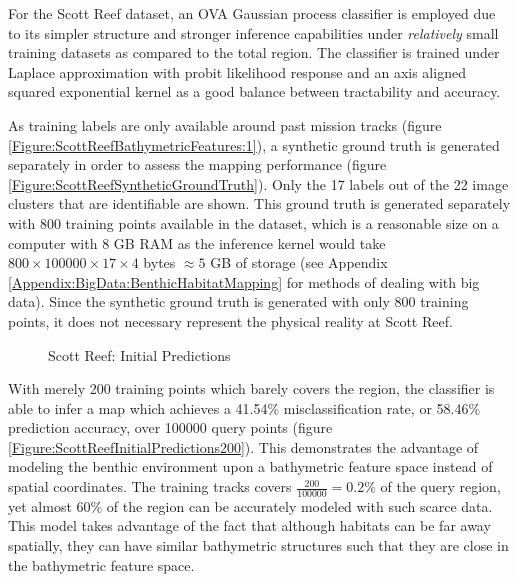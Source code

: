 		For the Scott Reef dataset, an OVA Gaussian process classifier is employed due to its simpler structure and stronger inference capabilities under \textit{relatively} small training datasets as compared to the total region. The classifier is trained under Laplace approximation with probit likelihood response and an axis aligned squared exponential kernel as a good balance between tractability and accuracy.

		As training labels are only available around past mission tracks (figure \ref{Figure:ScottReefBathymetricFeatures:1}), a synthetic ground truth is generated separately in order to assess the mapping performance (figure \ref{Figure:ScottReefSyntheticGroundTruth}). Only the 17 labels out of the 22 image clusters that are identifiable are shown. This ground truth is generated separately with 800 training points available in the dataset, which is a reasonable size on a computer with 8 GB RAM as the inference kernel would take $800 \times 100000 \times 17 \times 4$ bytes $\approx 5$ GB of storage (see Appendix \ref{Appendix:BigData:BenthicHabitatMapping} for methods of dealing with big data). Since the synthetic ground truth is generated with only 800 training points, it does not necessary represent the physical reality at Scott Reef. 

		\begin{figure}[!htbp]
		\centering
		\caption{Scott Reef: Initial Predictions}
		\label{Figure:ScottReefInitialPredictions}
		\end{figure}
		
		With merely 200 training points which barely covers the region, the classifier is able to infer a map which achieves a 41.54\% misclassification rate, or 58.46\% prediction accuracy, over 100000 query points (figure \ref{Figure:ScottReefInitialPredictions200}). This demonstrates the advantage of modeling the benthic environment upon a bathymetric feature space instead of spatial coordinates. The training tracks covers $\frac{200}{100000} = 0.2\%$ of the query region, yet almost 60\% of the region can be accurately modeled with such scarce data. This model takes advantage of the fact that although habitats can be far away spatially, they can have similar bathymetric structures such that they are close in the bathymetric feature space. 
												

